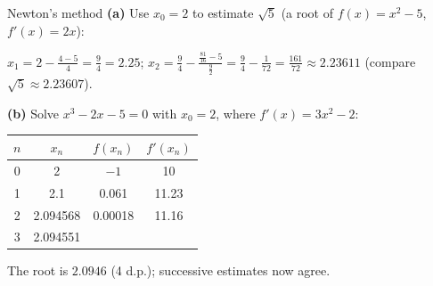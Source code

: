 \begin{example}{Newton's method}
\textbf{(a) \byhand} Use $x_0=2$ to estimate $\sqrt5$ (a root of $f(x)=x^2-5$, $f'(x)=2x$):\par
$x_1=2-\frac{4-5}{4}=\frac94=2.25$; \quad $x_2=\frac94-\frac{\frac{81}{16}-5}{\frac92}=\frac94-\frac{1}{72}=\frac{161}{72}\approx2.23611$ (compare $\sqrt5\approx2.23607$).\par
\textbf{(b) \examtwo} Solve $x^3-2x-5=0$ with $x_0=2$, where $f'(x)=3x^2-2$:\par
\begin{tabular}{@{}cccc@{}}
$n$ & $x_n$ & $f(x_n)$ & $f'(x_n)$\\ \hline
0 & 2 & $-1$ & 10\\
1 & 2.1 & 0.061 & 11.23\\
2 & 2.094568 & 0.00018 & 11.16\\
3 & 2.094551 & & \\
\end{tabular}\quad The root is $2.0946$ (4 d.p.); successive estimates now agree.
\end{example}
